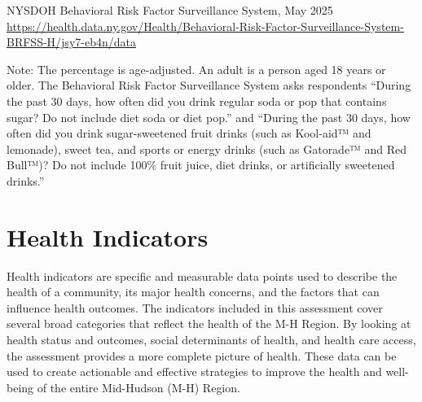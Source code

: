 \documentclass[
  english,
  letterpaper,
]{report}
\begin{document}
\begin{tcolorbox}[enhanced jigsaw, breakable, leftrule=.75mm, title=\textcolor{quarto-callout-note-color}{\faInfo}\hspace{0.5em}{Source}, bottomrule=.15mm, opacityback=0, left=2mm, colback=white, bottomtitle=1mm, coltitle=black, colbacktitle=quarto-callout-note-color!10!white, colframe=quarto-callout-note-color-frame, opacitybacktitle=0.6, toptitle=1mm, titlerule=0mm, arc=.35mm, rightrule=.15mm, toprule=.15mm]

NYSDOH Behavioral Risk Factor Surveillance System, May 2025\\
\url{https://health.data.ny.gov/Health/Behavioral-Risk-Factor-Surveillance-System-BRFSS-H/jsy7-eb4n/data}

\end{tcolorbox}

\begin{tcolorbox}[enhanced jigsaw, breakable, leftrule=.75mm, title=\textcolor{quarto-callout-note-color}{\faInfo}\hspace{0.5em}{Note}, bottomrule=.15mm, opacityback=0, left=2mm, colback=white, bottomtitle=1mm, coltitle=black, colbacktitle=quarto-callout-note-color!10!white, colframe=quarto-callout-note-color-frame, opacitybacktitle=0.6, toptitle=1mm, titlerule=0mm, arc=.35mm, rightrule=.15mm, toprule=.15mm]

Note: The percentage is age-adjusted. An adult is a person aged 18 years
or older. The Behavioral Risk Factor Surveillance System asks
respondents ``During the past 30 days, how often did you drink regular
soda or pop that contains sugar? Do not include diet soda or diet pop.''
and ``During the past 30 days, how often did you drink sugar-sweetened
fruit drinks (such as Kool-aid™ and lemonade), sweet tea, and sports or
energy drinks (such as Gatorade™ and Red Bull™)? Do not include 100\%
fruit juice, diet drinks, or artificially sweetened drinks.''

\end{tcolorbox}


\chapter{Health Indicators}\label{health-indicators}

Health indicators are specific and measurable data points used to
describe the health of a community, its major health concerns, and the
factors that can influence health outcomes. The indicators included in
this assessment cover several broad categories that reflect the health
of the M-H Region. By looking at health status and outcomes, social
determinants of health, and health care access, the assessment provides
a more complete picture of health. These data can be used to create
actionable and effective strategies to improve the health and well-being
of the entire Mid-Hudson (M-H) Region.
\end{document}
